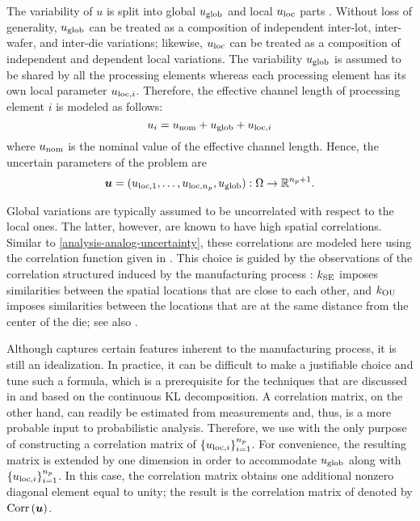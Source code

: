 The variability of $u$ is split into global $u_{\mathrm{glob}}$ and local $u_{\mathrm{loc}}$
parts \cite{shen2009, chandra2010}. Without loss of generality, $u_{\mathrm{glob}}$ can
be treated as a composition of independent inter-lot, inter-wafer, and inter-die
variations; likewise, $u_{\mathrm{loc}}$ can be treated as a composition of independent
and dependent local variations. The variability $u_{\mathrm{glob}}$ is assumed to be
shared by all the \np processing elements whereas each processing element has
its own local parameter $u_{\mathrm{loc}, i}$. Therefore, the effective channel length
of processing element $i$ is modeled as follows:
\[
  u_i = u_{\mathrm{nom}} + u_{\mathrm{glob}} + u_{\mathrm{loc}, i}
\]
where $u_{\mathrm{nom}}$ is the nominal value of the effective channel length. Hence,
the uncertain parameters of the problem are
\[
  \boldsymbol{u} = (u_{\mathrm{loc}, 1}, \dotsc, u_{\mathrm{loc}, {n_{p}}}, u_{\mathrm{glob}}): \Omega \to \mathbb{R}^{{n_{p}} + 1}.
\]

Global variations are typically assumed to be uncorrelated with respect to the
local ones. The latter, however, are known to have high spatial correlations.
Similar to \cref{analysis-analog-uncertainty}, these correlations are modeled
here using the correlation function given in . This
choice is guided by the observations of the correlation structured induced by
the manufacturing process \cite{friedberg2005, chandrakasan2000, cheng2011}:
$k_{\mathrm{SE}}$ imposes similarities between the spatial locations that are close to
each other, and $k_{\mathrm{OU}}$ imposes similarities between the locations that are at
the same distance from the center of the die; see also \cite{ghanem1991,
ghanta2006, bhardwaj2008, huang2009a, lee2013}.

Although  captures certain features inherent to the
manufacturing process, it is still an idealization. In practice, it can be
difficult to make a justifiable choice and tune such a formula, which is a
prerequisite for the techniques that are discussed in  and
based on the continuous \ac{KL} decomposition. A correlation matrix, on the
other hand, can readily be estimated from measurements and, thus, is a more
probable input to probabilistic analysis. Therefore, we use
 with the only purpose of constructing a correlation
matrix of $\{ u_{\mathrm{loc}, i} \}_{i = 1}^{n_{p}}$. For convenience, the resulting
matrix is extended by one dimension in order to accommodate $u_{\mathrm{glob}}$ along
with $\{ u_{\mathrm{loc}, i} \}_{i = 1}^{n_{p}}$. In this case, the correlation matrix
obtains one additional nonzero diagonal element equal to unity; the result is
the correlation matrix of \vu denoted by $\correlation{\vu}$.

